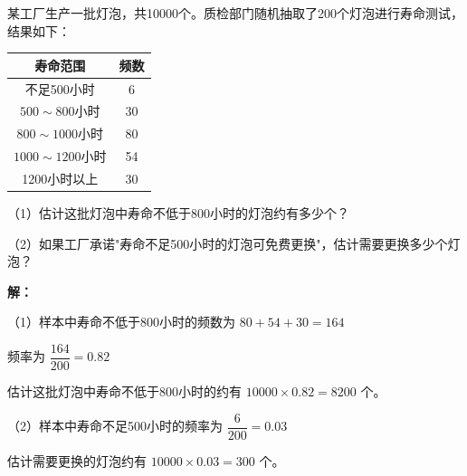 \documentclass[12pt, a4paper]{ctexart}
\begin{document}
\begin{appbox}[【应用2】产品质量检测]
某工厂生产一批灯泡，共10000个。质检部门随机抽取了200个灯泡进行寿命测试，结果如下：

\begin{center}
\begin{tabular}{|c|c|}
\hline
寿命范围 & 频数 \\
\hline
不足500小时 & 6 \\
\hline
$500 \sim 800$小时 & 30 \\
\hline
$800 \sim 1000$小时 & 80 \\
\hline
$1000 \sim 1200$小时 & 54 \\
\hline
1200小时以上 & 30 \\
\hline
\end{tabular}
\end{center}

（1）估计这批灯泡中寿命不低于800小时的灯泡约有多少个？

（2）如果工厂承诺"寿命不足500小时的灯泡可免费更换"，估计需要更换多少个灯泡？

\textbf{解：}

（1）样本中寿命不低于800小时的频数为 $80 + 54 + 30 = 164$

频率为 $\dfrac{164}{200} = 0.82$

估计这批灯泡中寿命不低于800小时的约有 $10000 \times 0.82 = 8200$ 个。

（2）样本中寿命不足500小时的频率为 $\dfrac{6}{200} = 0.03$

估计需要更换的灯泡约有 $10000 \times 0.03 = 300$ 个。
\end{appbox}
\end{document}
